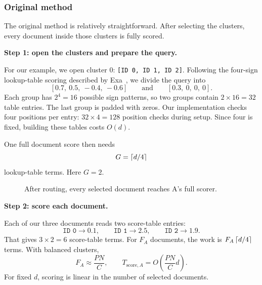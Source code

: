 \subsubsection{Original method}
The original method is relatively straightforward. After selecting the clusters, every document inside those clusters is fully scored.

\textbf{Step 1: open the clusters and prepare the query.}\par
For our example, we open cluster 0: \texttt{[ID 0, ID 1, ID 2]}. Following the four-sign lookup-table scoring described by Exa~\cite{exa}, we divide the query into
\[
 [0.7,\ 0.5,\ -0.4,\ -0.6]\qquad\text{and}\qquad[0.3,\ 0,\ 0,\ 0].
\]
Each group has $2^4=16$ possible sign patterns, so two groups contain $2\times16=32$ table entries. The last group is padded with zeros. Our implementation checks four positions per entry: $32\times4=128$ position checks during setup. Since four is fixed, building these tables costs $O(d)$.

One full document score then needs
\[
 G=\left\lceil d/4\right\rceil
\]
lookup-table terms. Here $G=2$.

\begin{figure}[htbp]\centering
{}
\caption{After routing, every selected document reaches A's full scorer.}
\end{figure}

\textbf{Step 2: score each document.}\par
Each of our three documents reads two score-table entries:
\[
 \texttt{ID 0}\longrightarrow0.1,\qquad
 \texttt{ID 1}\longrightarrow2.5,\qquad
 \texttt{ID 2}\longrightarrow1.9.
\]
That gives $3\times2=6$ score-table terms. For $F_A$ documents, the work is $F_A\left\lceil d/4\right\rceil$ terms. With balanced clusters,
\[
 F_A\approx\frac{PN}{C},\qquad
 T_{\mathrm{score},A}=O\!\left(\frac{PN}{C}d\right).
\]
For fixed $d$, scoring is linear in the number of selected documents.

